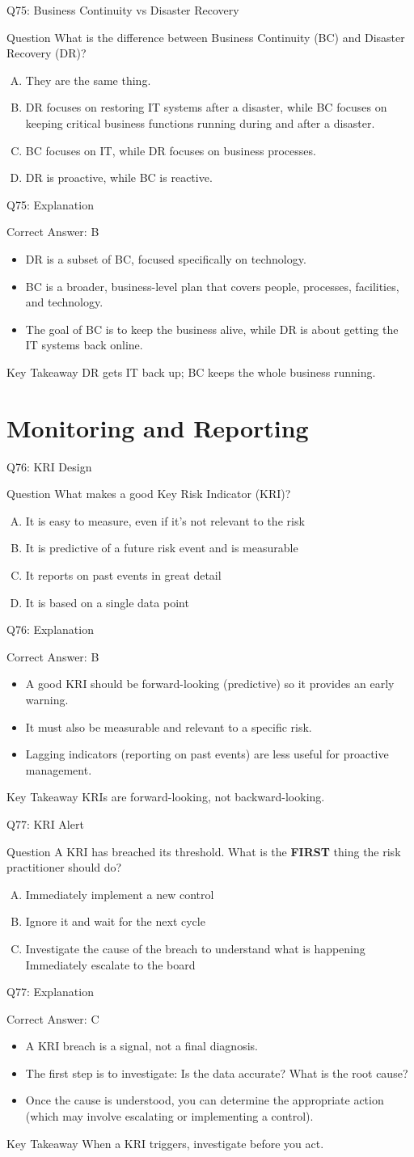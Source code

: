 \documentclass[aspectratio=169]{beamer}
\newcommand{\hq}[7]{%
	\begin{frame}{Q#1: #2}
		\begin{block}{Question}
			#3
		\end{block}
		\begin{enumerate}[(A)]
			#4
		\end{enumerate}
	\end{frame}
	\begin{frame}{Q#1: Explanation}
		\begin{block}{Correct Answer: #5}
			\begin{itemize}
				#6
			\end{itemize}
		\end{block}
		\begin{alertblock}{Key Takeaway}
			#7
		\end{alertblock}
	\end{frame}
}
\begin{document}
{		\hq{75}{Business Continuity vs Disaster Recovery}
		{What is the difference between Business Continuity (BC) and Disaster Recovery (DR)?}
		{\item They are the same thing.
			\item DR focuses on restoring IT systems after a disaster, while BC focuses on keeping critical business functions running during and after a disaster.
			\item BC focuses on IT, while DR focuses on business processes.
			\item DR is proactive, while BC is reactive.}
		{B}
		{\item DR is a subset of BC, focused specifically on technology.
			\item BC is a broader, business-level plan that covers people, processes, facilities, and technology.
			\item The goal of BC is to keep the business alive, while DR is about getting the IT systems back online.}
		{DR gets IT back up; BC keeps the whole business running.}
		
		\section{Monitoring and Reporting}
		
		\hq{76}{KRI Design}
		{What makes a good Key Risk Indicator (KRI)?}
		{\item It is easy to measure, even if it's not relevant to the risk
			\item It is predictive of a future risk event and is measurable
			\item It reports on past events in great detail
			\item It is based on a single data point}
		{B}
		{\item A good KRI should be forward-looking (predictive) so it provides an early warning.
			\item It must also be measurable and relevant to a specific risk.
			\item Lagging indicators (reporting on past events) are less useful for proactive management.}
		{KRIs are forward-looking, not backward-looking.}
		
		\hq{77}{KRI Alert}
		{A KRI has breached its threshold. What is the \textbf{FIRST} thing the risk practitioner should do?}
		{\item Immediately implement a new control
			\item Ignore it and wait for the next cycle
			\item Investigate the cause of the breach to understand what is happening
			\ditem Immediately escalate to the board}
		{C}
		{\item A KRI breach is a signal, not a final diagnosis.
			\item The first step is to investigate: Is the data accurate? What is the root cause?
			\item Once the cause is understood, you can determine the appropriate action (which may involve escalating or implementing a control).}
		{When a KRI triggers, investigate before you act.}
		
}
\end{document}

